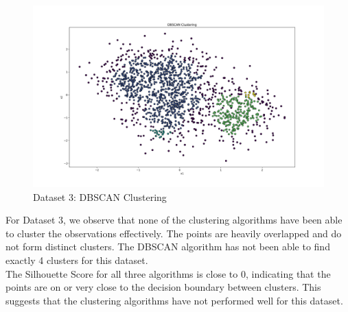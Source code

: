 \begin{figure}[H]
	\centering
	\includegraphics[width=0.9\linewidth]{Images/Clusters-5-v2-DBSCAN Clustering.png}
	\caption{Dataset 3: DBSCAN Clustering}
	\label{fig:clusters-5-v2-dbscan-clustering}
\end{figure}

For Dataset 3, we observe that none of the clustering algorithms have been able to cluster the observations effectively. The points are heavily overlapped and do not form distinct clusters. The DBSCAN algorithm has not been able to find exactly 4 clusters for this dataset. \\

The Silhouette Score for all three algorithms is close to 0, indicating that the points are on or very close to the decision boundary between clusters. This suggests that the clustering algorithms have not performed well for this dataset.

\clearpage